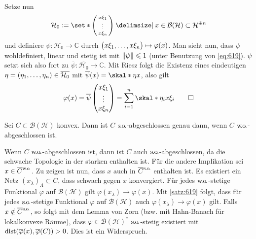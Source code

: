 \begin{beweis}
\begin{equation}
	\end{equation}
	Setze nun 
	\[
		\mathcal{H}_0 := \set*{\begin{psmallmatrix}
			x \xi_1 \\ \raisemath{2pt}{\vdots} \\ x \xi_n
		\end{psmallmatrix} \given x \in \mathcal{B}(\mathcal{H})} \subset \mathcal{H}^{\oplus n}
	\]
	und definiere $\psi \colon \mathcal{H}_0 \to \mathbb{C}$ durch $\enbrace[\big]{x \xi_1, \ldots , x \xi_n} \mapsto \varphi(x)$. 
	Man sieht nun, dass $\psi$ wohldefiniert, linear und stetig ist  mit $\norm*{\psi}\le 1$ (unter Benutzung von \eqref{eq:619}).
	$\psi$ setzt sich also fort zu $\overline{\psi} \colon \overline{\mathcal{H}_0} \to \mathbb{C}$.
	Mit Riesz folgt die Existenz eines eindeutigen $\eta= \enbrace*{\eta_1, \ldots ,\eta_n} \in \overline{\mathcal{H}_0}$ mit $\overline{\psi}(x) = \skal*{\eta}{x}$, also gilt
	\[
		\varphi(x) = \overline{\psi} \begin{pmatrix}
			x \xi_1 \\ \vdots \\ x \xi_n
		\end{pmatrix} = \sum_{i=1}^{n} \skal*{\eta_i}{x \xi_i}\qedhere
	\]
\end{beweis}

\begin{proposition}[{name=[konvexe Menge stark g.d.w schwach abgeschlossen]},label=prop:620]
	Sei $C \subset \mathcal{B}(\mathcal{H})$ konvex.
	Dann ist $C$ $\so$-abgeschlossen genau dann, wenn $C$ $\wo$-abgeschlossen ist.
\end{proposition}
\begin{beweis}[name={Idee}]
	Wenn $C$ $\wo$-abgeschlossen ist, dann ist $C$ auch $\so$-abgeschlossen, da die schwache Topologie in der starken enthalten ist.
	Für die andere Implikation sei $x \in \overline{C}^{\raisemath{-1.5pt}{\wo}}$. Zu zeigen ist nun, dass $x$ auch in $\overline{C}^{\raisemath{-1.5pt}{\so}}$ enthalten ist. 
	Es existiert ein Netz $(x_\lambda)_\Lambda \subset C$, dass schwach gegen $x$ konvergiert.
	Für jedes $\wo$-stetige Funktional $\varphi$ auf $\mathcal{B}(\mathcal{H})$ gilt $\varphi(x_\lambda) \to \varphi(x)$.
	Mit \autoref{satz:619} folgt, dass für jedes $\so$-stetige Funktional $\varphi$ auf $\mathcal{B}(\mathcal{H})$ auch $\varphi(x_\lambda) \to \varphi(x)$ gilt.
	Falls $x \notin \overline{C}^{\raisemath{-1.5pt}{\so}}$, so folgt mit dem Lemma von Zorn (bzw. mit Hahn-Banach für lokalkonvexe Räume), dass $\overline{\varphi} \in \mathcal{B}(\mathcal{H})^*$ $\so$-stetig existiert mit $\dist(\overline{\varphi}(x),\overline{\varphi}(C))>0$.
	Dies ist ein Widerspruch.
\end{beweis}

